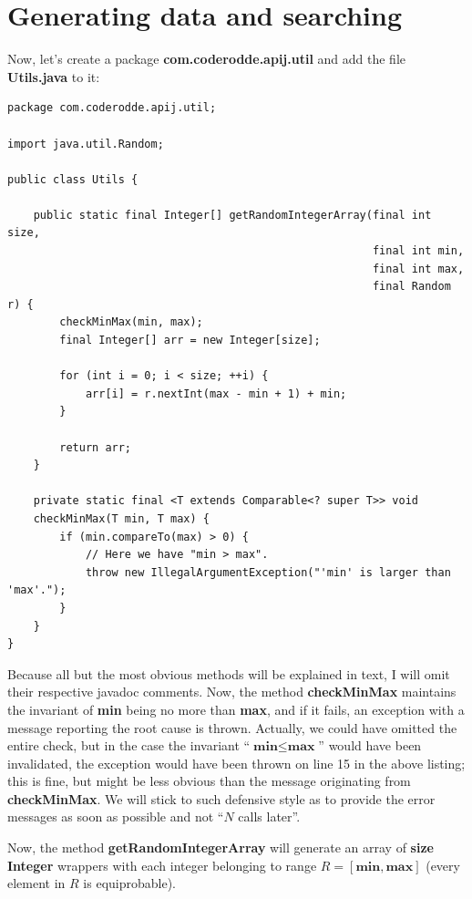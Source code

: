 \documentclass[oneside]{book}
\begin{document}
\section{Generating data and searching}
Now, let's create a package \textbf{com.coderodde.apij.util} and add the file \textbf{Utils.java} to it:
\begin{lstlisting}
package com.coderodde.apij.util;

import java.util.Random;

public class Utils {
    
    public static final Integer[] getRandomIntegerArray(final int size,
                                                        final int min,
                                                        final int max,
                                                        final Random r) {
        checkMinMax(min, max);
        final Integer[] arr = new Integer[size];
        
        for (int i = 0; i < size; ++i) {
            arr[i] = r.nextInt(max - min + 1) + min;
        }
        
        return arr;
    }
    
    private static final <T extends Comparable<? super T>> void 
    checkMinMax(T min, T max) {
        if (min.compareTo(max) > 0) {
            // Here we have "min > max".
            throw new IllegalArgumentException("'min' is larger than 'max'.");
        }
    }
}
\end{lstlisting}
Because all but the most obvious methods will be explained in text, I will omit their respective javadoc comments. Now, the method \textbf{checkMinMax} maintains the invariant of \textbf{min} being no more than \textbf{max}, and if it fails, an exception with a message reporting the root cause is thrown. Actually, we could have omitted the entire check, but in the case the invariant ``$\textbf{min} \leq \textbf{max}$'' would have been invalidated, the exception would have been thrown on line 15 in the above listing; this is fine, but might be less obvious than the message originating from \textbf{checkMinMax}. We will stick to such defensive style as to provide the error messages as soon as possible and not ``$N$ calls later''.

Now, the method \textbf{getRandomIntegerArray} will generate an array of \textbf{size} \textbf{Integer} wrappers with each integer belonging to range $R = [\textbf{min}, \textbf{max}]$ (every element in $R$ is equiprobable).
\end{document}
